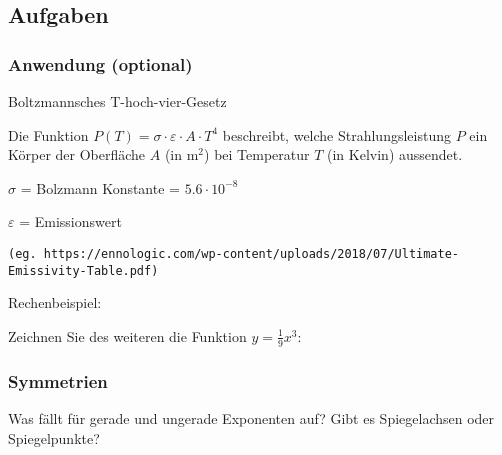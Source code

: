 \newpage
\subsection*{Aufgaben}

\TNTeop{}

\newpage

\subsubsection{Anwendung (optional)}
Boltzmannsches T-hoch-vier-Gesetz

\leserluft{}

Die Funktion $P(T) = \sigma\cdot\varepsilon\cdot
  A\cdot{}T^4$ beschreibt, welche Strahlungsleistung $P$ ein Körper der
  Oberfläche $A$ (in $ \text{m}^2$) bei Temperatur $T$ (in Kelvin) aussendet.

  $\sigma$ = Bolzmann Konstante = $5.6\cdot{}10^{-8}$
  
  $\varepsilon$ = Emissionswert

  \small{\texttt{(eg. https://ennologic.com/wp-content/uploads/2018/07/Ultimate-Emissivity-Table.pdf)}}

  \leserluft{}
  
  Rechenbeispiel:

\newpage

Zeichnen Sie des weiteren die Funktion $y = \frac{1}{9}x^3$:


\subsubsection{Symmetrien}
Was fällt für gerade und ungerade Exponenten auf? Gibt es Spiegelachsen
oder Spiegelpunkte?


